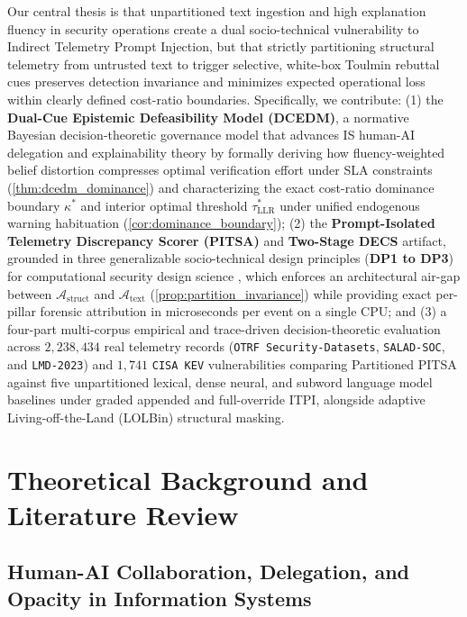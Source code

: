 \documentclass[11pt,a4paper]{article}
\let\oldtexttt\texttt
\renewcommand{\texttt}[1]{\textnormal{\oldtexttt{#1}}}
\begin{document}
Our central thesis is that unpartitioned text ingestion and high explanation fluency in security operations create a dual socio-technical vulnerability to Indirect Telemetry Prompt Injection, but that strictly partitioning structural telemetry from untrusted text to trigger selective, white-box Toulmin rebuttal cues preserves detection invariance and minimizes expected operational loss within clearly defined cost-ratio boundaries. Specifically, we contribute: (1) the \textbf{Dual-Cue Epistemic Defeasibility Model (DCEDM)}, a normative Bayesian decision-theoretic governance model that advances IS human-AI delegation and explainability theory \citep{baird2021next, fugener2022cognitive, revilla2023human, ansari2026partner, bag2025enhancing} by formally deriving how fluency-weighted belief distortion compresses optimal verification effort under SLA constraints (\cref{thm:dcedm_dominance}) and characterizing the exact cost-ratio dominance boundary $\kappa^*$ and interior optimal threshold $\tau^*_{\text{LLR}}$ under unified endogenous warning habituation (\cref{cor:dominance_boundary}); (2) the \textbf{Prompt-Isolated Telemetry Discrepancy Scorer (PITSA)} and \textbf{Two-Stage DECS} artifact, grounded in three generalizable socio-technical design principles (\textbf{DP1 to DP3}) for computational security design science \citep{ebrahimi2020semi, li2022assessing, ampel2024improving, tutun2024explainable}, which enforces an architectural air-gap between $\mathcal{A}_{\text{struct}}$ and $\mathcal{A}_{\text{text}}$ (\cref{prop:partition_invariance}) while providing exact per-pillar forensic attribution in microseconds per event on a single CPU; and (3) a four-part multi-corpus empirical and trace-driven decision-theoretic evaluation across $2,238,434$ real telemetry records (\texttt{OTRF Security-Datasets}, \texttt{SALAD-SOC}, and \texttt{LMD-2023}) and $1,741$ \texttt{CISA KEV} vulnerabilities comparing Partitioned PITSA against five unpartitioned lexical, dense neural, and subword language model baselines under graded appended and full-override ITPI, alongside adaptive Living-off-the-Land (LOLBin) structural masking.

\section{Theoretical Background and Literature Review}
\label{sec:literature}

\subsection{Human-AI Collaboration, Delegation, and Opacity in Information Systems}
\label{subsec:lit_delegation}
\end{document}
